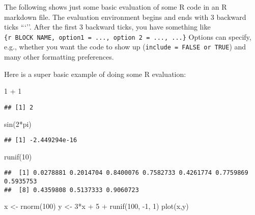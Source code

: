 \documentclass[
]{article}
\newenvironment{Shaded}{\begin{snugshade}}{\end{snugshade}}
\newcommand{\DecValTok}[1]{\textcolor[rgb]{0.00,0.00,0.81}{#1}}
\newcommand{\FunctionTok}[1]{\textcolor[rgb]{0.00,0.00,0.00}{#1}}
\newcommand{\NormalTok}[1]{#1}
\newcommand{\OtherTok}[1]{\textcolor[rgb]{0.56,0.35,0.01}{#1}}
\newcommand{\SpecialCharTok}[1]{\textcolor[rgb]{0.00,0.00,0.00}{#1}}
\begin{document}
The following shows just some basic evaluation of some R code in an R
markdown file. The evaluation environment begins and ends with 3
backward ticks ```''. After the first 3 backward ticks, you have
something like
\texttt{\{r\ BLOCK\ NAME,\ option1\ =\ ...,\ option\ 2\ =\ ...,\ ...\}}
Options can specify, e.g., whether you want the code to show up
(\texttt{include\ =\ FALSE\ or\ TRUE}) and many other formatting
preferences.

Here is a super basic example of doing some R evaluation:

\begin{Shaded}
\begin{Highlighting}[]
\DecValTok{1} \SpecialCharTok{+} \DecValTok{1}
\end{Highlighting}
\end{Shaded}

\begin{verbatim}
## [1] 2
\end{verbatim}

\begin{Shaded}
\begin{Highlighting}[]
\FunctionTok{sin}\NormalTok{(}\DecValTok{2}\SpecialCharTok{*}\NormalTok{pi)}
\end{Highlighting}
\end{Shaded}

\begin{verbatim}
## [1] -2.449294e-16
\end{verbatim}

\begin{Shaded}
\begin{Highlighting}[]
\FunctionTok{runif}\NormalTok{(}\DecValTok{10}\NormalTok{)}
\end{Highlighting}
\end{Shaded}

\begin{verbatim}
##  [1] 0.0278881 0.2014704 0.8400076 0.7582733 0.4261774 0.7759869 0.5935753
##  [8] 0.4359808 0.5137333 0.9060723
\end{verbatim}

\begin{Shaded}
\begin{Highlighting}[]
\NormalTok{x }\OtherTok{\textless{}{-}} \FunctionTok{rnorm}\NormalTok{(}\DecValTok{100}\NormalTok{)}
\NormalTok{y }\OtherTok{\textless{}{-}} \DecValTok{3}\SpecialCharTok{*}\NormalTok{x }\SpecialCharTok{+} \DecValTok{5} \SpecialCharTok{+} \FunctionTok{runif}\NormalTok{(}\DecValTok{100}\NormalTok{, }\SpecialCharTok{{-}}\DecValTok{1}\NormalTok{, }\DecValTok{1}\NormalTok{)}
\FunctionTok{plot}\NormalTok{(x,y)}
\end{Highlighting}
\end{Shaded}
\end{document}

